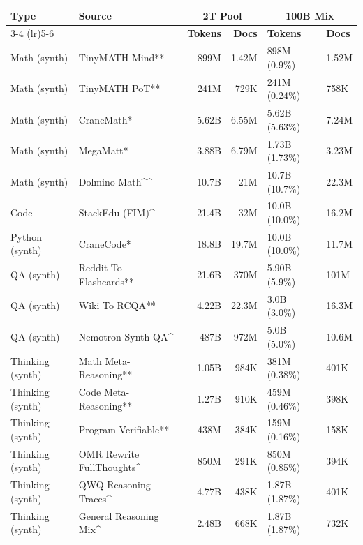 \documentclass[table]{ai2style/ai2}
\begin{document}
\begin{table}[!h]
\centering
\footnotesize
\small
\renewcommand{\arraystretch}{1}
\begin{tabular}{l l rr ll }
\toprule
{\bf Type} & 
{\bf Source} & 
\multicolumn{2}{c}{{\bf 2T Pool}} & 
\multicolumn{2}{c}{{\bf 100B Mix}} \\
\cmidrule(lr){3-4} \cmidrule(lr){5-6}
& & {\bf Tokens} & {\bf Docs} & {\bf Tokens} & {\bf Docs} \\
\midrule
    \rowcolor{ai2offwhite} Math (synth) & TinyMATH Mind** & 899M & 1.42M & 898M (0.9\%) & 1.52M  \\
    Math (synth) & TinyMATH PoT** & 241M & 729K & 241M (0.24\%) & 758K  \\
    \rowcolor{ai2offwhite} Math (synth) & CraneMath* & 5.62B & 6.55M & 5.62B (5.63\%) & 7.24M  \\
     Math (synth) & MegaMatt* & 3.88B & 6.79M & 1.73B (1.73\%) & 3.23M \\
     \rowcolor{ai2offwhite} Math (synth) & Dolmino Math\^{}\^{} & 10.7B & 21M & 10.7B (10.7\%) & 22.3M  \\
\midrule
    Code & StackEdu (FIM)\^{} & 21.4B & 32M & 10.0B  (10.0\%)& 16.2M  \\
    \rowcolor{ai2offwhite} Python (synth) & CraneCode* & 18.8B & 19.7M & 10.0B  (10.0\%)& 11.7M  \\
\midrule
    QA (synth) & Reddit To Flashcards** & 21.6B & 370M & 5.90B (5.9\%) & 101M  \\
    \rowcolor{ai2offwhite} QA (synth) & Wiki To RCQA** & 4.22B & 22.3M & 3.0B (3.0\%) & 16.3M  \\
    QA (synth) & Nemotron Synth QA\^{} & 487B & 972M & 5.0B (5.0\%) & 10.6M  \\
\midrule
    \rowcolor{ai2offwhite} Thinking (synth) & Math Meta-Reasoning** & 1.05B & 984K & 381M (0.38\%) & 401K \\
    Thinking (synth) & Code Meta-Reasoning** & 1.27B & 910K & 459M (0.46\%) & 398K \\
    \rowcolor{ai2offwhite} Thinking (synth) & Program-Verifiable** & 438M & 384K & 159M (0.16\%) & 158K \\
    Thinking (synth) & OMR Rewrite FullThoughts\^{} & 850M & 291K & 850M (0.85\%) & 394K \\
    \rowcolor{ai2offwhite} Thinking (synth) & QWQ Reasoning Traces\^{} & 4.77B & 438K & 1.87B (1.87\%) & 401K  \\
    Thinking (synth) & General Reasoning Mix\^{} & 2.48B & 668K & 1.87B  (1.87\%) & 732K \\

\end{tabular}
\end{table}
\end{document}
